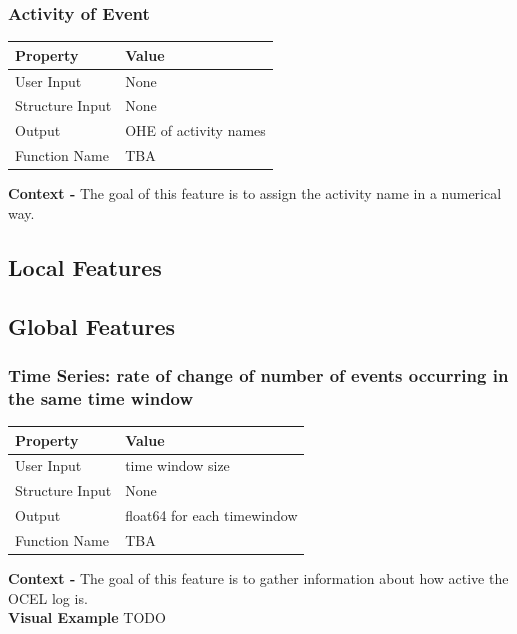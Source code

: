 \documentclass{article}
\begin{document}
\subsubsection{Activity of Event}
\begin{center}
	\begin{tabular}{| p{3cm} p{7cm} |}
		\hline
		\textbf{Property} & \textbf{Value}\\
		\hline
		User Input & None\\
		Structure Input & None\\
		Output & OHE of activity names\\
		Function Name & TBA\\
		\hline
	\end{tabular}
\end{center}

\textbf{Context -} The goal of this feature is to assign the activity name in a numerical way.
\\

\subsection{Local Features}
\subsection{Global Features}

\subsubsection{Time Series: rate of change of number of events occurring in the same time window}
\begin{center}
	\begin{tabular}{| p{3cm} p{7cm} |}
		\hline
		\textbf{Property} & \textbf{Value}\\
		\hline
		User Input & time window size\\
		Structure Input & None\\
		Output & float64 for each timewindow\\
		Function Name & TBA\\
		\hline
	\end{tabular}
\end{center}

\textbf{Context -} The goal of this feature is to gather information about how active the OCEL log is.
\\

\textbf{Visual Example}
TODO
\end{document}
